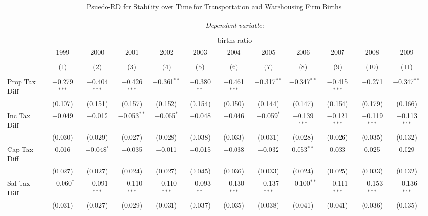 
\begin{table}[!htbp] \centering 
  \caption{Psuedo-RD for Stability over Time for  Transportation and Warehousing Firm Births} 
  \label{48-49year} 
\small 
\begin{tabular}{@{\extracolsep{5pt}}lccccccccccc} 
\\[-1.8ex]\hline 
\hline \\[-1.8ex] 
 & \multicolumn{11}{c}{\textit{Dependent variable:}} \\ 
\cline{2-12} 
\\[-1.8ex] & \multicolumn{11}{c}{births ratio} \\ 
 & 1999 & 2000 & 2001 & 2002 & 2003 & 2004 & 2005 & 2006 & 2007 & 2008 & 2009 \\ 
\\[-1.8ex] & (1) & (2) & (3) & (4) & (5) & (6) & (7) & (8) & (9) & (10) & (11)\\ 
\hline \\[-1.8ex] 
 Prop Tax Diff & $-$0.279$^{***}$ & $-$0.404$^{***}$ & $-$0.426$^{***}$ & $-$0.361$^{**}$ & $-$0.380$^{**}$ & $-$0.461$^{***}$ & $-$0.317$^{**}$ & $-$0.347$^{**}$ & $-$0.415$^{***}$ & $-$0.271 & $-$0.347$^{**}$ \\ 
  & (0.107) & (0.151) & (0.157) & (0.152) & (0.154) & (0.150) & (0.144) & (0.147) & (0.154) & (0.179) & (0.166) \\ 
  Inc Tax Diff & $-$0.049 & $-$0.012 & $-$0.053$^{**}$ & $-$0.055$^{*}$ & $-$0.048 & $-$0.046 & $-$0.059$^{*}$ & $-$0.139$^{***}$ & $-$0.121$^{***}$ & $-$0.119$^{***}$ & $-$0.113$^{***}$ \\ 
  & (0.030) & (0.029) & (0.027) & (0.028) & (0.038) & (0.033) & (0.031) & (0.028) & (0.026) & (0.035) & (0.032) \\ 
  Cap Tax Diff & 0.016 & $-$0.048$^{*}$ & $-$0.035 & $-$0.011 & $-$0.015 & $-$0.038 & $-$0.032 & 0.053$^{**}$ & 0.033 & 0.025 & 0.029 \\ 
  & (0.027) & (0.027) & (0.024) & (0.027) & (0.045) & (0.036) & (0.033) & (0.024) & (0.025) & (0.033) & (0.032) \\ 
  Sal Tax Diff & $-$0.060$^{*}$ & $-$0.091$^{***}$ & $-$0.110$^{***}$ & $-$0.110$^{***}$ & $-$0.093$^{**}$ & $-$0.130$^{***}$ & $-$0.137$^{***}$ & $-$0.100$^{**}$ & $-$0.111$^{***}$ & $-$0.153$^{***}$ & $-$0.136$^{***}$ \\ 
  & (0.031) & (0.027) & (0.029) & (0.031) & (0.037) & (0.035) & (0.038) & (0.041) & (0.041) & (0.036) & (0.035) \\ 

\end{tabular}
\end{table}
